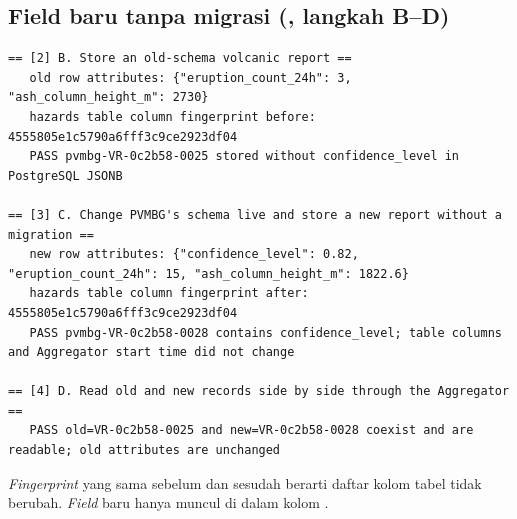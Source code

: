 \subsection*{Field baru tanpa migrasi (, langkah B--D)}
\begin{lstlisting}
== [2] B. Store an old-schema volcanic report ==
   old row attributes: {"eruption_count_24h": 3, "ash_column_height_m": 2730}
   hazards table column fingerprint before: 4555805e1c5790a6fff3c9ce2923df04
   PASS pvmbg-VR-0c2b58-0025 stored without confidence_level in PostgreSQL JSONB

== [3] C. Change PVMBG's schema live and store a new report without a migration ==
   new row attributes: {"confidence_level": 0.82, "eruption_count_24h": 15, "ash_column_height_m": 1822.6}
   hazards table column fingerprint after: 4555805e1c5790a6fff3c9ce2923df04
   PASS pvmbg-VR-0c2b58-0028 contains confidence_level; table columns and Aggregator start time did not change

== [4] D. Read old and new records side by side through the Aggregator ==
   PASS old=VR-0c2b58-0025 and new=VR-0c2b58-0028 coexist and are readable; old attributes are unchanged
\end{lstlisting}

\emph{Fingerprint} yang sama sebelum dan sesudah berarti daftar kolom tabel tidak berubah. \emph{Field} baru hanya muncul di
dalam kolom .

